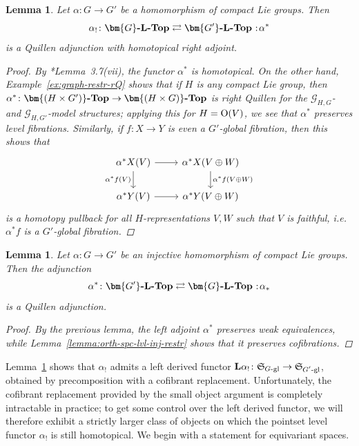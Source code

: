 \documentclass[reqno]{memo-l}
\theoremstyle{mythm}
\newtheorem{lemma}[thm]{Lemma}
\theoremstyle{definition}
\numberwithin{equation}{section}
\newcommand{\cat}[1]{\textbf{\textup{#1}}}
\renewcommand{\O}{{\textup{O}}}
\newcommand\noloc{%
	\nobreak
	\mspace{6mu plus 1mu}
	{:}
	\nonscript\mkern-\thinmuskip
	\mathpunct{}
	\mspace{2mu}
}
\newcommand{\myS}{{{\mathfrak S\kern-.4pt}}}
\begin{document}
\begin{lemma}\label{lemma:restr-right-Quillen}
    Let $\alpha\colon G\to G'$ be a homomorphism of compact Lie groups. Then
    \[
        \alpha_!\colon\cat{$\bm{G}$-$\cat{L}$-Top}\rightleftarrows\cat{$\bm{G'}$-$\cat{L}$-Top}\noloc \alpha^*
    \]
    is a Quillen adjunction with homotopical right adjoint.
    \begin{proof}
        By \cite{barrero2021}*{Lemma~3.7(vii)}, the functor $\alpha^*$ is homotopical. On the other hand, Example~\ref{ex:graph-restr-rQ} shows that if $H$ is any compact Lie group, then $\alpha^*\colon\cat{$\bm{(H\times G')}$-Top}\to \cat{$\bm{(H\times G)}$-Top}$ is right Quillen for the $\mathcal G_{H,G}$- and $\mathcal G_{H,G'}$-model structures; applying this for $H=\O(V)$, we see that $\alpha^*$ preserves \emph{level} fibrations. Similarly, if $f\colon X\to Y$ is even a $G'$-global fibration, then this shows that
        \[
            \begin{tikzcd}
                \alpha^*X(V)\arrow[r]\arrow[d,"\alpha^*f(V)"'] & \alpha^*X(V\oplus W)\arrow[d,"\alpha^*f(V\oplus W)"]\\
                \alpha^*Y(V)\arrow[r] & \alpha^*Y(V\oplus W)
            \end{tikzcd}
        \]
        is a homotopy pullback for all $H$-representations $V,W$ such that $V$ is faithful, i.e.\ $\alpha^*f$ is a $G'$-global fibration.
    \end{proof}
\end{lemma}

\begin{lemma}\label{lemma:restr-inj-left-Quillen}
    Let $\alpha\colon G\to G'$ be an \emph{injective} homomorphism of compact Lie groups. Then the adjunction
    \[
        \alpha^*\colon\cat{$\bm{G'}$-$\cat{L}$-Top}\rightleftarrows\cat{$\bm{G}$-$\cat{L}$-Top} \noloc \alpha_*
    \]
    is a Quillen adjunction.
    \begin{proof}
        By the previous lemma, the left adjoint $\alpha^*$ preserves weak equivalences, while Lemma~\ref{lemma:orth-spc-lvl-inj-restr} shows that it preserves cofibrations.
    \end{proof}
\end{lemma}

Lemma~\ref{lemma:restr-right-Quillen} shows that $\alpha_!$ admits a left derived functor $\cat{L}\alpha_!\colon\myS_\text{$G$-gl}\to\myS_\text{$G'$-gl}$, obtained by precomposition with a cofibrant replacement. Unfortunately, the cofibrant replacement provided by the small object argument is completely intractable in practice; to get some control over the left derived functor, we will therefore exhibit a strictly larger class of objects on which the pointset level functor $\alpha_!$ is still homotopical. We begin with a statement for equivariant spaces.
\end{document}
